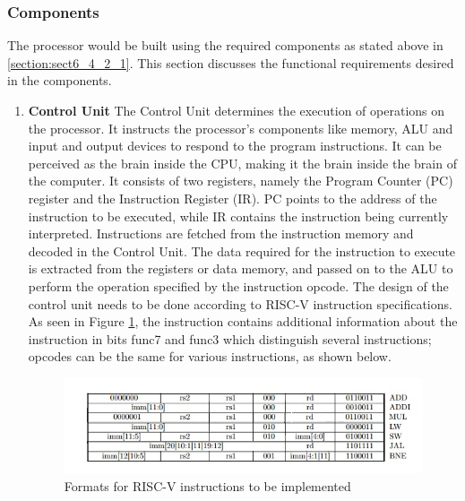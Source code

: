 \subsubsection{Components}
\label{sect6_4_2_2}
The processor would be built using the required components as stated above in \ref{section:sect6_4_2_1}. This section discusses the functional requirements desired in the components.

\begin{enumerate}
\item \textbf{Control Unit} \newline
The Control Unit determines the execution of operations on the processor. It instructs the processor’s components like memory, ALU and input and output devices to respond to the program instructions. It can be perceived as the brain inside the CPU, making it the brain inside the brain of the computer. \newline\newline
It consists of two registers, namely the Program Counter (PC) register and the Instruction Register (IR). PC points to the address of the instruction to be executed, while IR contains the instruction being currently interpreted. Instructions are fetched from the instruction memory and decoded in the Control Unit. The data required for the instruction to execute is extracted from the registers or data memory, and passed on to the ALU to perform the operation specified by the instruction opcode. \newline\newline
The design of the control unit needs to be done according to RISC-V instruction specifications. As seen in Figure \ref{fig:riscv5}, the instruction contains additional information about the instruction in bits func7 and func3 which distinguish several instructions; opcodes can be the same for various instructions, as shown below.

\begin{figure}[h!]
\includegraphics[width=\linewidth]{figures/RISCV_Instruction_Formats.jpg}
\caption{Formats for RISC-V instructions to be implemented}
\label{fig:riscv5}
\end{figure}


\end{enumerate}
